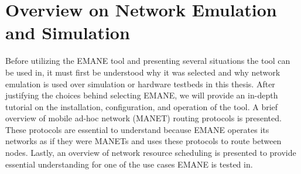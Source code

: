 \chapter{Overview on Network Emulation and Simulation}
\label{chapter2}

Before utilizing the EMANE tool and presenting several situations the tool can be used in, it must first be understood why it was selected and why network emulation is used over simulation or hardware testbeds in this thesis.
After justifying the choices behind selecting EMANE, we will provide an in-depth tutorial on the installation, configuration, and operation of the tool.
A brief overview of mobile ad-hoc network (MANET) routing protocols is presented. These protocols are essential to understand because EMANE operates its networks as if they were MANETs and uses these protocols to route between nodes.
Lastly, an overview of network resource scheduling is presented to provide essential understanding for one of the use cases EMANE is tested in.

